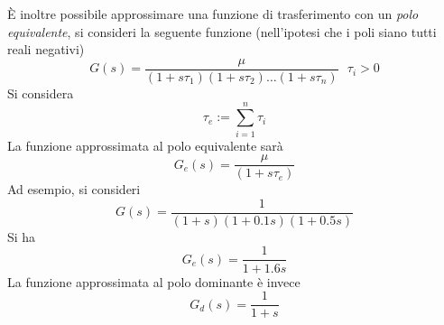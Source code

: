 \documentclass[10pt, letterpaper]{report}
\begin{document}
    È inoltre possibile approssimare una funzione di trasferimento 
    con un \textit{polo equivalente}, si consideri la seguente funzione (nell'ipotesi che i 
    poli siano tutti reali negativi)
    $$ G(s)=\frac{\mu}{(1+s\tau_1)(1+s\tau_2)\dots (1+s\tau_n)} \ \ \ \tau_i>0$$
Si considera 
$$ \tau_e :=\sum_{i=1}^{n}\tau_i$$
La funzione approssimata al polo equivalente sarà 
$$ G_e(s)=\frac{\mu}{(1+s\tau_e)}$$
Ad esempio, si consideri 
$$ G(s)=\frac{1}{(1+s)(1+0.1s)(1+0.5s)}$$
Si ha 
$$ G_e(s)=\frac{1}{1+1.6s}$$
La funzione approssimata al polo dominante è invece 
$$ G_d(s)=\frac{1}{1+s}$$
\begin{center}
    \begin{figure}[h!]
        \centering
    \end{figure}
\end{center}
\flowerLine 
\end{document}

